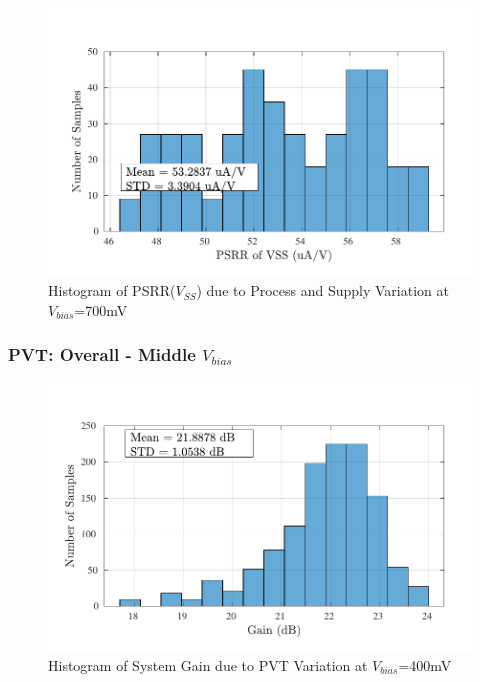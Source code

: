 \begin{figure} [H]
\centering
\includegraphics[scale=1]{Figures/Corners/Overall/PV_Max/PDFs/PV_Max_psrrn.pdf}
\caption{Histogram of PSRR($V_{SS}$) due to Process and Supply Variation at $V_{bias}$=700mV}
\end{figure}

\subsubsection{PVT: Overall - Middle $V_{bias}$}

\begin{figure} [H]
\centering
\includegraphics[scale=1]{Figures/Corners/Overall/PVT_Mid/PDFs/PVT_Mid_gain.pdf}
\caption{Histogram of System Gain due to PVT Variation at $V_{bias}$=400mV}
\end{figure}

